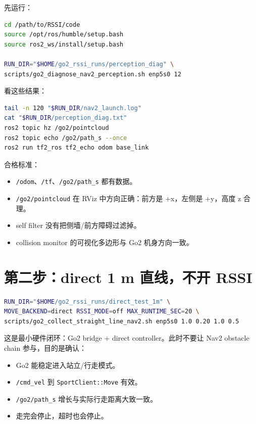 \documentclass[UTF8,11pt,a4paper,openany]{ctexrep}
\newcommand{\code}[1]{\nolinkurl{#1}}
\newcommand{\topic}[1]{\nolinkurl{#1}}
\begin{document}
先运行：

\begin{lstlisting}[language=bash]
cd /path/to/RSSI/code
source /opt/ros/humble/setup.bash
source ros2_ws/install/setup.bash

RUN_DIR="$HOME/go2_rssi_runs/perception_diag" \
scripts/go2_diagnose_nav2_perception.sh enp5s0 12
\end{lstlisting}

看这些结果：

\begin{lstlisting}[language=bash]
tail -n 120 "$RUN_DIR/nav2_launch.log"
cat "$RUN_DIR/perception_diag.txt"
ros2 topic hz /go2/pointcloud
ros2 topic echo /go2/path_s --once
ros2 run tf2_ros tf2_echo odom base_link
\end{lstlisting}

合格标准：

\begin{itemize}
  \item \topic{/odom}、\topic{/tf}、\topic{/go2/path_s} 都有数据。
  \item \topic{/go2/pointcloud} 在 RViz 中方向正确：前方是 +x，左侧是 +y，高度 z 合理。
  \item self filter 没有把侧墙/前方障碍过滤掉。
  \item collision monitor 的可视化多边形与 Go2 机身方向一致。
\end{itemize}

\section{第二步：direct 1 m 直线，不开 RSSI}

\begin{lstlisting}[language=bash]
RUN_DIR="$HOME/go2_rssi_runs/direct_test_1m" \
MOVE_BACKEND=direct RSSI_MODE=off MAX_RUNTIME_SEC=20 \
scripts/go2_collect_straight_line_nav2.sh enp5s0 1.0 0.20 1.0 0.5
\end{lstlisting}

这是最小硬件闭环：Go2 bridge + direct controller。此时不要让 Nav2 obstacle chain 参与，目的是确认：

\begin{itemize}
  \item Go2 能稳定进入站立/行走模式。
  \item \topic{/cmd_vel} 到 \code{SportClient::Move} 有效。
  \item \topic{/go2/path_s} 增长与实际行走距离大致一致。
  \item 走完会停止，超时也会停止。
\end{itemize}
\end{document}
